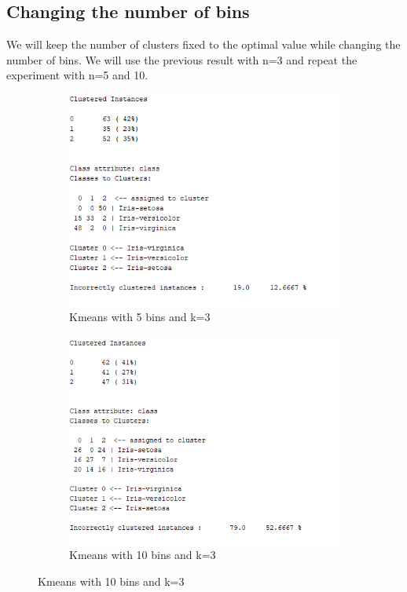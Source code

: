 \documentclass[letterpaper,12pt]{article}
\begin{document}
\subsection{Changing the number of bins}

We will keep the number of clusters fixed to the optimal value while changing the number of bins. We will use the previous result with n=3 and repeat the experiment with n=5 and 10.

\begin{figure}[H]
\begin{subfigure}{.5\textwidth}
  \centering
  \includegraphics[width=.8\linewidth]{5bins_3cl_output}  
  \caption{Kmeans with 5 bins and k=3}
  \label{fig:sub-first_2}
\end{subfigure}
\begin{subfigure}{.5\textwidth}
  \centering
  \includegraphics[width=.8\linewidth]{10_bins_3cl_output}  
  \caption{Kmeans with 10 bins and k=3}
  \label{fig:sub-second_2}

\end{subfigure}
\end{figure}
\end{document}
